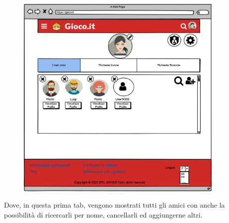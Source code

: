 \documentclass[../Report.tex]{subfiles}
\begin{document}
    \begin{figure}[H]
        \includegraphics[width=10cm]{WAmici1.png}
        \centering
    \end{figure}

    Dove, in questa prima tab, vengono mostrati tutti gli amici con anche la possibilità di ricercarli per nome, cancellarli ed aggiungerne altri.
\end{document}
